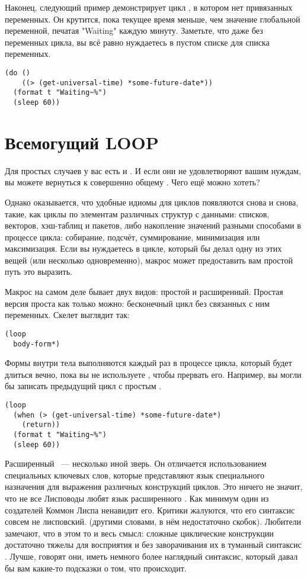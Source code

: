 Наконец, следующий пример демонстрирует цикл , в котором нет привязанных
переменных. Он крутится, пока текущее время меньше, чем значение глобальной переменной,
печатая "Waiting" каждую минуту. Заметьте, что даже без переменных цикла, вы всё равно
нуждаетесь в пустом списке для списка переменных.

\begin{lstlisting}
(do ()
    ((> (get-universal-time) *some-future-date*))
  (format t "Waiting~%")
  (sleep 60)) 
\end{lstlisting}

\section{Всемогущий LOOP}

Для простых случаев у вас есть  и . И если они не удовлетворяют
вашим нуждам, вы можете вернуться к совершенно общему . Чего ещё можно хотеть?

Однако оказывается, что удобные идиомы для циклов появляются снова и снова, такие, как
циклы по элементам различных структур с данными: списков, векторов, хэш-таблиц и пакетов,
либо накопление значений разными способами в процессе цикла: собирание, подсчёт,
суммирование, минимизация или максимизация. Если вы нуждаетесь в цикле, который бы делал
одну из этих вещей (или несколько одновременно), макрос  может предоставить вам
простой путь это выразить.

Макрос  на самом деле бывает двух видов: простой и расширенный. Простая версия
проста как только можно: бесконечный цикл без связанных с ним переменных. Скелет выглядит
так:

\begin{lstlisting}
(loop
  body-form*)
\end{lstlisting}

Формы внутри тела выполняются каждый раз в процессе цикла, который будет длиться вечно,
пока вы не используете , чтобы прервать его. Например, вы могли бы записать
предыдущий  цикл с простым .

\begin{lstlisting}
(loop
  (when (> (get-universal-time) *some-future-date*)
    (return))
  (format t "Waiting~%")
  (sleep 60))
\end{lstlisting}

Расширенный ~--- несколько иной зверь. Он отличается использованием специальных
ключевых слов, которые представляют язык специального назначения для выражения различных
конструкций циклов. Это ничего не значит, что не все Лисповоды любят язык расширенного
. Как минимум один из создателей Коммон Лиспа ненавидит его. Критики
 жалуются, что его синтаксис совсем не лисповский. (другими словами, в нём
недостаточно скобок). Любители  замечают, что в этом то и весь смысл: сложные
циклические конструкции достаточно тяжелы для восприятия и без заворачивания их в туманный
синтаксис . Лучше, говорят они, иметь немного более наглядный синтаксис, который
давал бы вам какие-то подсказки о том, что происходит.


